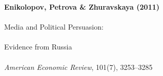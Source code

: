 \documentclass[12pt]{article}
\begin{document}
\begin{center}
{\Large\bfseries Enikolopov, Petrova \& Zhuravskaya (2011)}\\\\
{\large Media and Political Persuasion:}\\\\
{\large Evidence from Russia}\\\\
\vspace{0.5em}
{\normalsize \textit{American Economic Review}, 101(7), 3253--3285}
\end{center}

\vspace{1em}




\end{document}
